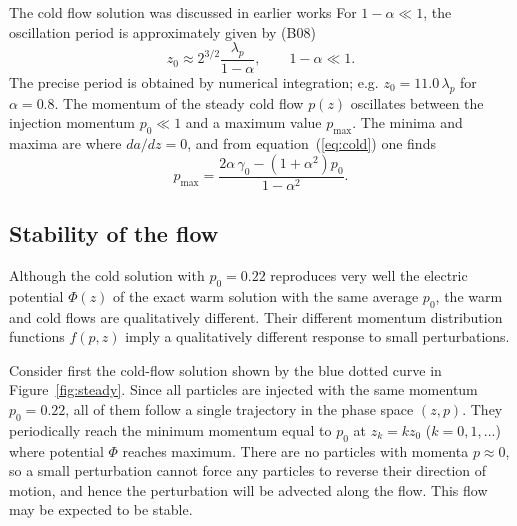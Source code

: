 The cold flow solution was discussed in earlier works
\citep[B08]{mestel_axisymmetric_1985}
For $1-\alpha\ll 1$, the oscillation period is approximately given by (B08)
\begin{equation}
    z_0 \approx 2^{3/2}\frac{\lambda_p}{1-\alpha}, \qquad 1-\alpha\ll 1.
\end{equation}
The precise period is obtained by numerical integration; e.g.
$z_0=11.0\,\lambda_p$ for $\alpha=0.8$.
The momentum of the steady cold flow $p(z)$ oscillates between the injection
momentum $p_0\ll 1$ and a maximum value $p_{\max}$. The minima and
maxima are where $da/dz=0$, and from equation~(\ref{eq:cold}) one finds
\begin{equation}
\label{eq:pmax}
    p_{\max}=\frac{2\alpha\,\gamma_0-(1+\alpha^2)p_0}{1-\alpha^2}.
\end{equation}


\subsection{Stability of the flow}


Although the cold solution with $p_0=0.22$ reproduces very well the electric
potential $\Phi(z)$ of the exact warm solution with the same average $p_0$,
the warm and cold flows are qualitatively different. Their different
momentum distribution functions $f(p,z)$ imply a qualitatively different response
to small perturbations.

Consider first the cold-flow solution
shown by the blue dotted curve in Figure~\ref{fig:steady}.
Since all particles are injected with the same momentum $p_0=0.22$,
all of them follow a single trajectory in the phase space $(z,p)$.
They periodically reach the minimum momentum equal to $p_0$ at
$z_k=kz_0$ ($k=0,1,...$) where potential $\Phi$ reaches maximum.
There are no particles with momenta $p\approx 0$, so
a small perturbation cannot force any particles to reverse their direction of motion,
and hence the perturbation will be advected along the flow.
This flow may be expected to be stable.

